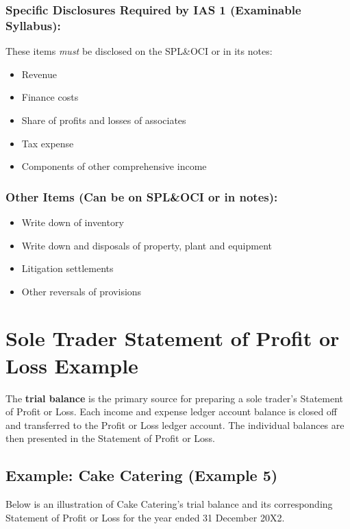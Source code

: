 \subsubsection*{Specific Disclosures Required by IAS 1 (Examinable Syllabus):}
These items \textit{must} be disclosed on the SPL\&OCI or in its notes:

\begin{itemize}
    \item Revenue
    \item Finance costs
    \item Share of profits and losses of associates
    \item Tax expense
    \item Components of other comprehensive income
\end{itemize}

\subsubsection*{Other Items (Can be on SPL\&OCI or in notes):}

\begin{itemize}
    \item Write down of inventory
    \item Write down and disposals of property, plant and equipment
    \item Litigation settlements
    \item Other reversals of provisions
\end{itemize}

\section{Sole Trader Statement of Profit or Loss Example}

The \textbf{trial balance} is the primary source for preparing a sole trader's Statement of Profit or Loss. Each income and expense ledger account balance is closed off and transferred to the Profit or Loss ledger account. The individual balances are then presented in the Statement of Profit or Loss.

\subsection*{Example: Cake Catering (Example 5)}

Below is an illustration of Cake Catering's trial balance and its corresponding Statement of Profit or Loss for the year ended 31 December 20X2.

